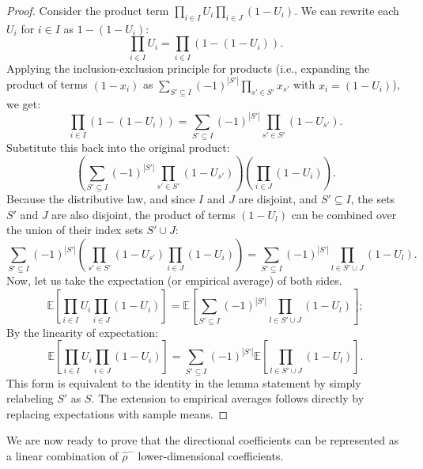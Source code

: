 \documentclass[11pt,a4paper]{article}
\begin{document}
\begin{proof}
Consider the product term $\prod_{i \in I} U_i \prod_{i \in J} (1-U_i)$. We can rewrite each $U_i$ for $i \in I$ as $1 - (1-U_i)$:
$$ \prod_{i \in I} U_i = \prod_{i \in I} (1 - (1-U_i)).$$
Applying the inclusion-exclusion principle for products (i.e., expanding the product of terms $(1-x_i)$ as $\sum_{S' \subseteq I} (-1)^{|S'|} \prod_{s' \in S'} x_{s'}$ with $x_i = (1-U_i)$), we get:
$$ \prod_{i \in I} (1 - (1-U_i)) = \sum_{S' \subseteq I} (-1)^{|S'|} \prod_{s' \in S'} (1-U_{s'}).$$
Substitute this back into the original product:
$$ \left( \sum_{S' \subseteq I} (-1)^{|S'|} \prod_{s' \in S'} (1-U_{s'}) \right) \left( \prod_{i \in J} (1-U_i) \right).$$
Because the distributive law, and since $I$ and $J$ are disjoint, and $S' \subseteq I$, the sets $S'$ and $J$ are also disjoint, the product of terms $(1-U_l)$ can be combined over the union of their index sets $S' \cup J$:
$$ \sum_{S' \subseteq I} (-1)^{|S'|} \left( \prod_{s' \in S'} (1-U_{s'}) \prod_{i \in J} (1-U_i) \right) = \sum_{S' \subseteq I} (-1)^{|S'|} \prod_{l \in S' \cup J} (1-U_l).$$
Now, let us take the expectation (or empirical average) of both sides.
$$ \mathbb{E}\left[ \prod_{i \in I} U_i \prod_{i \in J} (1-U_i) \right] = \mathbb{E}\left[ \sum_{S' \subseteq I} (-1)^{|S'|} \prod_{l \in S' \cup J} (1-U_l) \right];$$
By the linearity of expectation:
$$ \mathbb{E}\left[ \prod_{i \in I} U_i \prod_{i \in J} (1-U_i) \right] = \sum_{S' \subseteq I} (-1)^{|S'|} \mathbb{E}\left[ \prod_{l \in S' \cup J} (1-U_l) \right].$$
This form is equivalent to the identity in the lemma statement by simply relabeling $S'$ as $S$. The extension to empirical averages follows directly by replacing expectations with sample means.
\end{proof}

We are now ready to prove that the directional coefficients can be represented as a linear combination of $\widehat{\rho}^-$ lower-dimensional coefficients.
\end{document}
